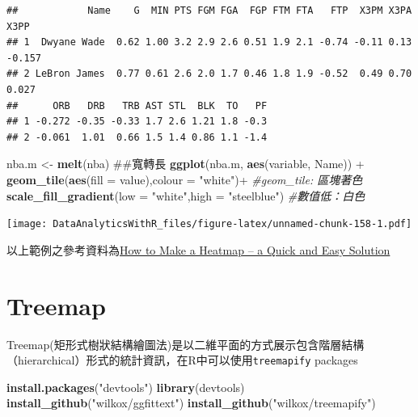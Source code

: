 \documentclass[]{book}
\newenvironment{Shaded}{\begin{snugshade}}{\end{snugshade}}
\newcommand{\KeywordTok}[1]{\textcolor[rgb]{0.13,0.29,0.53}{\textbf{{#1}}}}
\newcommand{\DataTypeTok}[1]{\textcolor[rgb]{0.13,0.29,0.53}{{#1}}}
\newcommand{\StringTok}[1]{\textcolor[rgb]{0.31,0.60,0.02}{{#1}}}
\newcommand{\CommentTok}[1]{\textcolor[rgb]{0.56,0.35,0.01}{\textit{{#1}}}}
\newcommand{\NormalTok}[1]{{#1}}
\theoremstyle{definition}
\theoremstyle{definition}
\theoremstyle{remark}
\begin{document}
\begin{verbatim}
##            Name    G  MIN PTS FGM FGA  FGP FTM FTA   FTP  X3PM X3PA   X3PP
## 1  Dwyane Wade  0.62 1.00 3.2 2.9 2.6 0.51 1.9 2.1 -0.74 -0.11 0.13 -0.157
## 2 LeBron James  0.77 0.61 2.6 2.0 1.7 0.46 1.8 1.9 -0.52  0.49 0.70  0.027
##      ORB   DRB   TRB AST STL  BLK  TO   PF
## 1 -0.272 -0.35 -0.33 1.7 2.6 1.21 1.8 -0.3
## 2 -0.061  1.01  0.66 1.5 1.4 0.86 1.1 -1.4
\end{verbatim}

\begin{Shaded}
\begin{Highlighting}[]
\NormalTok{nba.m <-}\StringTok{ }\KeywordTok{melt}\NormalTok{(nba) ##寬轉長}
\KeywordTok{ggplot}\NormalTok{(nba.m, }\KeywordTok{aes}\NormalTok{(variable, Name)) +}\StringTok{ }
\StringTok{    }\KeywordTok{geom_tile}\NormalTok{(}\KeywordTok{aes}\NormalTok{(}\DataTypeTok{fill =} \NormalTok{value),}\DataTypeTok{colour =} \StringTok{"white"}\NormalTok{)+}\StringTok{ }\CommentTok{#geom_tile: 區塊著色}
\StringTok{    }\KeywordTok{scale_fill_gradient}\NormalTok{(}\DataTypeTok{low =} \StringTok{"white"}\NormalTok{,}\DataTypeTok{high =} \StringTok{"steelblue"}\NormalTok{) }\CommentTok{#數值低：白色}
\end{Highlighting}
\end{Shaded}

\texttt{[image: DataAnalyticsWithR\_files/figure-latex/unnamed-chunk-158-1.pdf]}

以上範例之參考資料為\href{http://flowingdata.com/2010/01/21/how-to-make-a-heatmap-a-quick-and-easy-solution/}{How
to Make a Heatmap -- a Quick and Easy Solution}

\section{Treemap}\label{treemap}

Treemap(矩形式樹狀結構繪圖法)是以二維平面的方式展示包含階層結構（hierarchical）形式的統計資訊，在R中可以使用\texttt{treemapify}\citep{R-treemapify}
packages

\begin{Shaded}
\begin{Highlighting}[]
\KeywordTok{install.packages}\NormalTok{(}\StringTok{"devtools"}\NormalTok{)}
\KeywordTok{library}\NormalTok{(devtools)}
\KeywordTok{install_github}\NormalTok{(}\StringTok{"wilkox/ggfittext"}\NormalTok{)}
\KeywordTok{install_github}\NormalTok{(}\StringTok{"wilkox/treemapify"}\NormalTok{) }
\end{Highlighting}
\end{Shaded}
\end{document}
